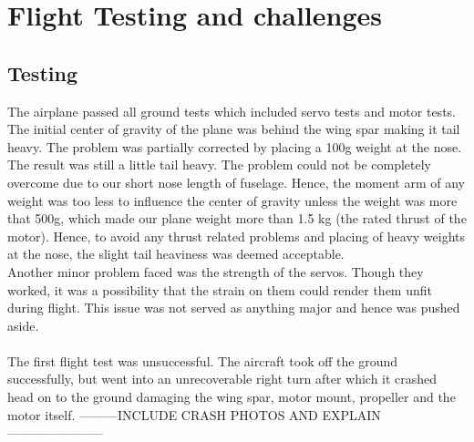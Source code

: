 \chapter{Flight Testing and challenges}
\label{ch6}

\section{Testing}
The airplane passed all ground tests which included servo tests and motor tests. The initial center of gravity of the plane was behind the wing spar making it tail heavy. The problem was partially corrected by placing a 100g weight at the nose. The result was still a little tail heavy. The problem could not be completely overcome due to our short nose length of fuselage. Hence, the moment arm of any weight was too less to influence the center of gravity unless the weight was more that 500g, which made our plane weight more than 1.5 kg (the rated thrust of the motor). Hence, to avoid any thrust related problems and placing of heavy weights at the nose, the slight tail heaviness was deemed acceptable.
\\
Another minor problem faced was the strength of the servos. Though they worked, it was a possibility that the strain on them could render them unfit during flight. This issue was not served as anything major and hence was pushed aside.
\\
\\
The first flight test was unsuccessful. The aircraft took off the ground successfully, but went into an unrecoverable right turn after which it crashed head on to the ground damaging the wing spar, motor mount, propeller and the motor itself. 
---------INCLUDE CRASH PHOTOS AND EXPLAIN -----------------------


